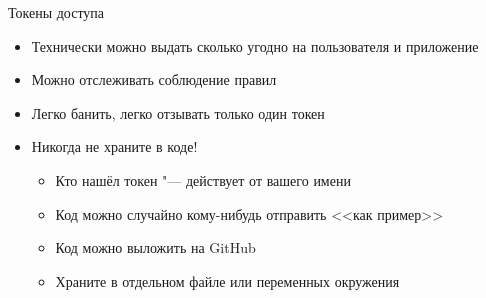 \begin{frame}[t]{Токены доступа}
	\begin{itemize}
		\item Технически можно выдать сколько угодно на пользователя и приложение
		\item Можно отслеживать соблюдение правил
		\item Легко банить, легко отзывать только один токен
		\item Никогда не храните в коде!
			\begin{itemize}
			\item Кто нашёл токен "--- действует от вашего имени
			\item Код можно случайно кому-нибудь отправить <<как пример>>
			\item Код можно выложить на GitHub
			\item Храните в отдельном файле или переменных окружения
			\end{itemize}
	\end{itemize}
\end{frame}
